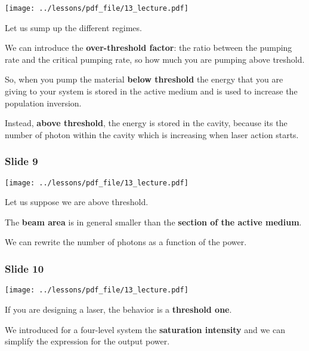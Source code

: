 \documentclass[../main/main.tex]{subfiles}
\begin{document}
\begin{minipage}[]{0.5\linewidth}
\centering
\texttt{[image: ../lessons/pdf\_file/13\_lecture.pdf]}
\end{minipage}
\hspace{0.3cm}\vspace{0.3cm}
\begin{minipage}[c]{0.47\linewidth}

Let us sump up the different regimes.

We can introduce the \textbf{over-threshold factor}: the ratio between the pumping rate and the critical pumping rate, so how much you are pumping above treshold.

So, when you pump the material \textbf{below threshold} the energy that you are giving to your system is stored in the active medium and is used to increase the population inversion.

Instead, \textbf{above threshold}, the energy is stored in the cavity, because its the number of photon within the cavity which is increasing when laser action starts.

\end{minipage}

\subsubsection*{Slide 9}

\begin{minipage}[]{0.5\linewidth}
\centering
\texttt{[image: ../lessons/pdf\_file/13\_lecture.pdf]}
\end{minipage}
\hspace{0.3cm}\vspace{0.3cm}
\begin{minipage}[c]{0.47\linewidth}

Let us suppose we are above threshold.

The \textbf{beam area} is in general smaller than the \textbf{section of the active medium}.

We can rewrite the number of photons as a function of the power.

\end{minipage}

\subsubsection*{Slide 10}

\begin{minipage}[]{0.5\linewidth}
\centering
\texttt{[image: ../lessons/pdf\_file/13\_lecture.pdf]}
\end{minipage}
\hspace{0.3cm}\vspace{0.3cm}
\begin{minipage}[c]{0.47\linewidth}

If you are designing a laser, the behavior is a \textbf{threshold one}.

We introduced for a four-level system the \textbf{saturation intensity} and we can simplify the expression for the output power.

\end{minipage}
\end{document}

